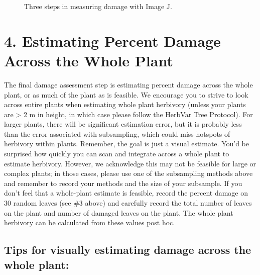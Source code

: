 \documentclass[
  letterpaper,
  DIV=11,
  numbers=noendperiod]{scrreprt}
\begin{document}
\begin{figure}


\caption{\label{fig-imagej}Three steps in measuring damage with Image
J.}

\end{figure}%

\section{4. Estimating Percent Damage Across the Whole
Plant}\label{estimating-percent-damage-across-the-whole-plant}

The final damage assessment step is estimating percent damage across the
whole plant, or as much of the plant as is feasible. We encourage you to
strive to look across entire plants when estimating whole plant
herbivory (unless your plants are \textgreater{} 2 m in height, in which
case please follow the HerbVar Tree Protocol). For larger plants, there
will be significant estimation error, but it is probably less than the
error associated with subsampling, which could miss hotspots of
herbivory within plants. Remember, the goal is just a visual estimate.
You'd be surprised how quickly you can scan and integrate across a whole
plant to estimate herbivory. However, we acknowledge this may not be
feasible for large or complex plants; in those cases, please use one of
the subsampling methods above and remember to record your methods and
the size of your subsample. If you don't feel that a whole-plant
estimate is feasible, record the percent damage on 30 random leaves (see
\#3 above) and carefully record the total number of leaves on the plant
and number of damaged leaves on the plant. The whole plant herbivory can
be calculated from these values post hoc.

\subsection{Tips for visually estimating damage across the whole
plant:}\label{tips-for-visually-estimating-damage-across-the-whole-plant}
\end{document}
